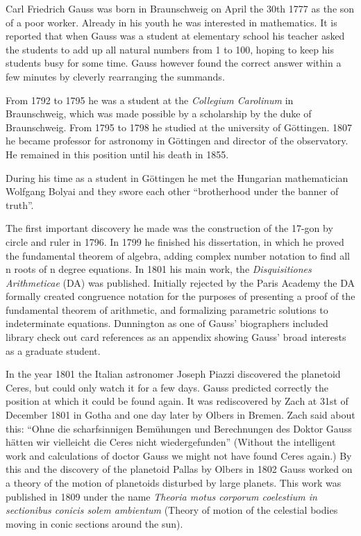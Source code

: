 \documentclass[12pt]{article}
\begin{document}
Carl Friedrich Gauss was born in Braunschweig on April the 30th 1777 as the son of a poor worker. Already in his youth he was interested in mathematics. It is reported that when Gauss was a student at elementary school his teacher asked the students to add up all natural numbers from 1 to 100, hoping to keep his students busy for some time. Gauss however found the correct answer within a few minutes by cleverly rearranging the summands.

From 1792 to 1795 he was a student at the \textit{Collegium Carolinum} in Braunschweig, which was made possible by a scholarship by the duke of Braunschweig. From 1795 to 1798 he studied at the university of G\"ottingen. 1807 he became professor for astronomy in G\"ottingen and director of the observatory. He remained in this position until his death in 1855.

During his time as a student in G\"ottingen he met the Hungarian mathematician Wolfgang Bolyai and they swore each other ``brotherhood under the banner of truth''.

The first important discovery he made was the construction of the 17-gon by circle and ruler in 1796. In 1799 he finished his dissertation, in which he proved the fundamental theorem of algebra, adding complex number notation to find all n roots of n degree equations. In 1801 his main work, the \textit{Disquisitiones Arithmeticae} (DA) was published. Initially rejected by the Paris Academy the DA formally created congruence notation for the purposes of presenting a proof of the fundamental theorem of arithmetic, and formalizing parametric solutions to indeterminate equations. Dunnington as one of Gauss' biographers included library check out card references as an appendix showing Gauss' broad interests as a graduate student.

In the year 1801 the Italian astronomer Joseph Piazzi discovered the planetoid Ceres, but could only watch it for a few days. Gauss predicted correctly the position at which it could be found again. It was rediscovered by Zach at 31st of December 1801  in Gotha and one day later by Olbers in Bremen. Zach said about this: ``Ohne die scharfsinnigen Bem\"uhungen und Berechnungen des Doktor Gauss h\"atten wir vielleicht die Ceres nicht wiedergefunden'' (Without the intelligent work and calculations of doctor Gauss we might not have found Ceres again.)
By this and the discovery of the planetoid Pallas by Olbers in 1802 Gauss worked on a theory of the motion of planetoids disturbed by large planets. This work was published in 1809 under the name \textit{Theoria motus corporum coelestium in sectionibus conicis solem ambientum} (Theory of motion of the celestial bodies moving in conic sections around the sun).
\end{document}
